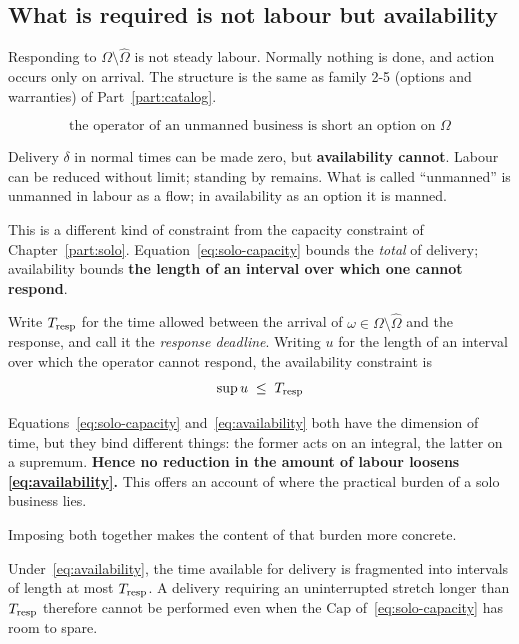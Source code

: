 \subsection{What is required is not labour but availability}

Responding to $\Omega\setminus\hat\Omega$ is not steady labour. Normally nothing is done, and
action occurs only on arrival. The structure is the same as family 2-5 (options and
warranties) of Part~\ref{part:catalog}.

\begin{equation}
\text{the operator of an unmanned business is short an option on }\Omega
\end{equation}

Delivery $\delta$ in normal times can be made zero, but \textbf{availability cannot}.
Labour can be reduced without limit; standing by remains. What is called ``unmanned'' is
unmanned in labour as a flow; in availability as an option it is manned.

This is a different kind of constraint from the capacity constraint of
Chapter~\ref{part:solo}. Equation~\eqref{eq:solo-capacity} bounds the \emph{total} of
delivery; availability bounds \textbf{the length of an interval over which one cannot
respond}.

\begin{definition}
\label{def:availability}
Write $T_{\rm resp}$ for the time allowed between the arrival of
$\omega\in\Omega\setminus\hat\Omega$ and the response, and call it the \emph{response
deadline}. Writing $u$ for the length of an interval over which the operator cannot respond,
the availability constraint is
\begin{equation}
\sup u \;\leq\; T_{\rm resp}
\label{eq:availability}
\end{equation}
\end{definition}

Equations~\eqref{eq:solo-capacity} and~\eqref{eq:availability} both have the dimension of
time, but they bind different things: the former acts on an integral, the latter on a
supremum. \textbf{Hence no reduction in the amount of labour loosens
\eqref{eq:availability}.} This offers an account of where the practical burden of a solo
business lies.

Imposing both together makes the content of that burden more concrete.

\begin{proposition}
\label{prop:granularity}
Under~\eqref{eq:availability}, the time available for delivery is fragmented into intervals
of length at most $T_{\rm resp}$. A delivery requiring an uninterrupted stretch longer than
$T_{\rm resp}$ therefore cannot be performed even when the $\mathrm{Cap}$
of~\eqref{eq:solo-capacity} has room to spare.
\end{proposition}

